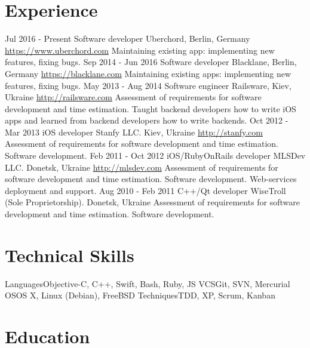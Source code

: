 \documentclass[11pt,a4paper]{moderncv}
\begin{document}
\section{Experience}
\cventry
  {Jul 2016 - Present}
  {Software developer}
  {Uberchord, Berlin, Germany}
  {\newline{}\url{https://www.uberchord.com}}{}
  {Maintaining existing app: implementing new features, fixing bugs.}
\cventry
  {Sep 2014 - Jun 2016}
  {Software developer}
  {Blacklane, Berlin, Germany}
  {\newline{}\url{https://blacklane.com}}{}
  {Maintaining existing apps: implementing new features, fixing bugs.}
\cventry
  {May 2013 - Aug 2014}
  {Software engineer}
  {Railsware, Kiev, Ukraine}
  {\newline{}\url{http://railsware.com}}{}
  {Assessment of requirements for software development and time estimation.\newline{}
  Taught backend developers how to write iOS apps and learned from backend developers how to write backends.}
\cventry
  {Oct 2012 - Mar 2013}
  {iOS developer}
  {Stanfy LLC. Kiev, Ukraine}
  {\newline{}\url{http://stanfy.com}}{}
  {Assessment of requirements for software development and time estimation.
  \newline{}Software development.}
\cventry
  {Feb 2011 - Oct 2012}
  {iOS/RubyOnRails developer}
  {MLSDev LLC. Donetsk, Ukraine}
  {\newline{}\url{http://mlsdev.com}}{}
  {Assessment of requirements for software development and time estimation.\newline{}
  Software development. Web-services deployment and support.}
\cventry
  {Aug 2010 - Feb 2011}
  {C++/Qt developer}
  {WiseTroll (Sole Proprietorship). Donetsk, Ukraine}
  {}{}
  {Assessment of requirements for software development and time estimation.
  \newline{}Software development.}

\section{Technical Skills}
\cvline
  {Languages}{Objective-C, C++, Swift, Bash, Ruby, JS}
\cvline
  {VCS}{Git, SVN, Mercurial}
\cvline
  {OS}{OS X, Linux (Debian), FreeBSD}
\cvline
  {Techniques}{TDD, XP, Scrum, Kanban}

\section{Education}
\end{document}
